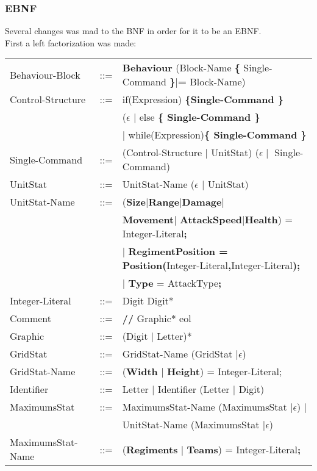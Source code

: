 	\subsubsection{EBNF}
		Several changes was mad to the BNF in order for it to be an EBNF. \\
		First a left factorization was made: \\
		\begin{center}
			\begin{tabular}{ l l l }
				Behaviour-Block	   &	::=	 & {\bf Behaviour} (Block-Name {\bf \{} Single-Command {\bf \}}$\mid${\bf = } Block-Name)   \\
				Control-Structure  &  	::=  & if(Expression) \bf{\{}Single-Command \bf{\}}  \\
								   &  	     & ($\epsilon$ $\mid$ else \bf{\{ }Single-Command \bf{\} } \\					   
								   &   		 & $\mid$ while(Expression)\bf{\{ } Single-Command \bf{\}} \\
				Single-Command     &	::=  & (Control-Structure $\mid$ UnitStat) ($\epsilon \mid$ Single-Command)      \\		
		  		UnitStat		   &	::=  & UnitStat-Name ($\epsilon$ $\mid$ UnitStat)   		  \\
		  		UnitStat-Name	   &	::=	 & ({\bf Size}$\mid${\bf  Range}$\mid${\bf Damage}$\mid$\\
		  						   &    	 &	{\bf Movement}$\mid$ {\bf AttackSpeed}$\mid${\bf Health}) = Integer-Literal{\bf ;} \\ 
								   &	     & $\mid$ {\bf RegimentPosition = Position(}Integer-Literal{\bf ,}Integer-Literal{\bf );} \\
								   &		 & $\mid$ {\bf Type} = AttackType{\bf ;}	     											\\
				Integer-Literal    &	::=  & Digit Digit* \\
				Comment			   &    ::=  & {\bf //} Graphic* eol \\
				Graphic			   &	::=	 & (Digit $\mid$ Letter)* \\
				GridStat		   &	::=  & GridStat-Name (GridStat $\mid \epsilon$)  \\
				GridStat-Name	   &	::=  & ({\bf Width} $\mid$ {\bf Height}) = Integer-Literal; \\
				Identifier 		   &    ::=  & Letter $\mid$ Identifier (Letter $\mid$ Digit) \\	
				MaximumsStat	   &	::=  & MaximumsStat-Name (MaximumsStat $\mid \epsilon$) $\mid$ \\
								   &	     & UnitStat-Name (MaximumsStat $\mid \epsilon$)		\\	
				MaximumsStat-Name  &	::=  & ({\bf Regiments }$\mid$ {\bf Teams}) =  Integer-Literal{\bf ;} \\			
			\end{tabular}
		\end{center}					   
